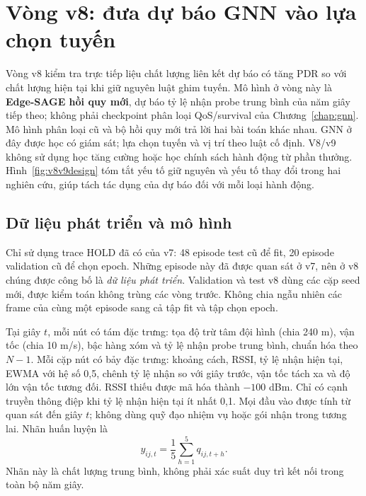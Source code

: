 \section{Vòng v8: đưa dự báo GNN vào lựa chọn tuyến}\label{sec:m8}
Vòng v8 kiểm tra trực tiếp liệu chất lượng liên kết dự báo có tăng PDR so với
chất lượng hiện tại khi giữ nguyên luật ghim tuyến. Mô hình ở vòng này là
\textbf{Edge-SAGE hồi quy mới}, dự báo tỷ lệ nhận probe trung bình của năm giây
tiếp theo; không phải checkpoint phân loại QoS/survival của Chương~\ref{chap:gnn}.
Mô hình phân loại cũ và bộ hồi quy mới trả lời hai bài toán khác nhau.
GNN ở đây được học có giám sát; lựa chọn tuyến và vị trí theo luật cố định.
V8/v9 không sử dụng học tăng cường hoặc học chính sách hành động từ phần thưởng.
Hình~\ref{fig:v8v9design} tóm tắt yếu tố giữ nguyên và yếu tố thay đổi trong
hai nghiên cứu, giúp tách tác dụng của dự báo đối với mỗi loại hành động.

\subsection{Dữ liệu phát triển và mô hình}
Chỉ sử dụng trace HOLD đã có của v7: 48 episode test cũ để fit, 20 episode
validation cũ để chọn epoch. Những episode này đã được quan sát ở v7, nên ở
v8 chúng được công bố là \emph{dữ liệu phát triển}. Validation và test v8 dùng
các cặp seed mới, được kiểm toán không trùng các vòng trước. Không chia ngẫu
nhiên các frame của cùng một episode sang cả tập fit và tập chọn epoch.

Tại giây $t$, mỗi nút có tám đặc trưng: tọa độ trừ tâm đội hình (chia 240 m),
vận tốc (chia 10 m/s), bậc hàng xóm và tỷ lệ nhận probe trung bình, chuẩn hóa
theo $N-1$. Mỗi cặp nút có bảy đặc trưng: khoảng cách, RSSI, tỷ lệ nhận hiện
tại, EWMA với hệ số 0,5, chênh tỷ lệ nhận so với giây trước, vận tốc tách xa
và độ lớn vận tốc tương đối. RSSI thiếu được mã hóa thành $-100$ dBm.
Chỉ có cạnh truyền thông điệp khi tỷ lệ nhận hiện tại ít nhất 0,1.
Mọi đầu vào được tính từ quan sát đến giây $t$; không dùng quỹ đạo nhiệm vụ
hoặc gói nhận trong tương lai. Nhãn huấn luyện là
\begin{equation}
 y_{ij,t}=\frac{1}{5}\sum_{h=1}^{5}q_{ij,t+h}.
\end{equation}
Nhãn này là chất lượng trung bình, không phải xác suất duy trì kết nối trong
toàn bộ năm giây.

